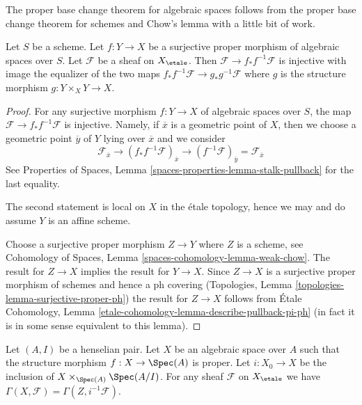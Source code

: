 \noindent
The proper base change theorem for algebraic spaces follows from
the proper base change theorem for schemes and Chow's lemma
with a little bit of work.

\begin{lemma}
\label{lemma-surjective-proper}
Let $S$ be a scheme. Let $f : Y \to X$ be a surjective proper morphism
of algebraic spaces over $S$. Let $\mathcal{F}$ be a sheaf on $X_\etale$.
Then $\mathcal{F} \to f_*f^{-1}\mathcal{F}$ is injective with
image the equalizer of the two maps
$f_*f^{-1}\mathcal{F} \to g_*g^{-1}\mathcal{F}$ where
$g$ is the structure morphism $g : Y \times_X Y \to X$.
\end{lemma}

\begin{proof}
For any surjective morphism $f : Y \to X$ of algebraic spaces over $S$,
the map $\mathcal{F} \to f_*f^{-1}\mathcal{F}$ is injective.
Namely, if $\overline{x}$ is a geometric point of $X$, then we
choose a geometric point $\overline{y}$ of $Y$ lying over $\overline{x}$
and we consider
$$
\mathcal{F}_{\overline{x}} \to
(f_*f^{-1}\mathcal{F})_{\overline{x}} \to
(f^{-1}\mathcal{F})_{\overline{y}} = \mathcal{F}_{\overline{x}}
$$
See Properties of Spaces, Lemma \ref{spaces-properties-lemma-stalk-pullback}
for the last equality.

\medskip\noindent
The second statement is local on $X$ in the \'etale topology, hence we may
and do assume $Y$ is an affine scheme.

\medskip\noindent
Choose a surjective proper morphism $Z \to Y$ where $Z$ is a scheme, see
Cohomology of Spaces, Lemma \ref{spaces-cohomology-lemma-weak-chow}.
The result for $Z \to X$ implies the result for $Y \to X$.
Since $Z \to X$ is a surjective proper morphism of schemes
and hence a ph covering
(Topologies, Lemma \ref{topologies-lemma-surjective-proper-ph})
the result for $Z \to X$ follows from
\'Etale Cohomology, Lemma \ref{etale-cohomology-lemma-describe-pullback-pi-ph}
(in fact it is in some sense equivalent to this lemma).
\end{proof}

\begin{lemma}
\label{lemma-h0-proper-over-henselian-pair}
Let $(A, I)$ be a henselian pair. Let $X$ be an algebraic space over $A$
such that the structure morphism $f : X \to \Spec(A)$ is proper.
Let $i : X_0 \to X$ be the inclusion of $X \times_{\Spec(A)} \Spec(A/I)$.
For any sheaf $\mathcal{F}$ on $X_\etale$ we
have $\Gamma(X, \mathcal{F}) = \Gamma(Z, i^{-1}\mathcal{F})$.
\end{lemma}

